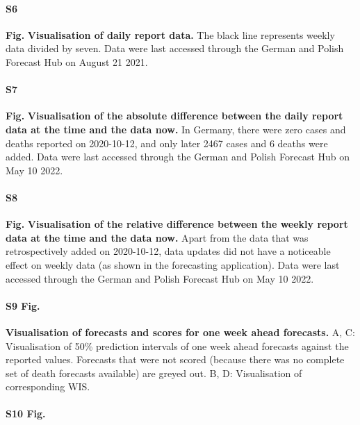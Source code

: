 \documentclass[10pt,letterpaper]{article}
\begin{document}
\paragraph{S6}

\textbf{Fig.} \label{fig:daily-truth}
\textbf{Visualisation of daily report data.} The black line represents
weekly data divided by seven. Data were last accessed through the German
and Polish Forecast Hub on August 21 2021.

\paragraph{S7}

\textbf{Fig.} \label{fig:daily-truth-update}
\textbf{Visualisation of the absolute difference between the daily report data at the time and the data now.}
In Germany, there were zero cases and deaths reported on 2020-10-12, and
only later 2467 cases and 6 deaths were added. Data were last accessed
through the German and Polish Forecast Hub on May 10 2022.

\paragraph{S8}

\textbf{Fig.} \label{fig:weekly-truth-update}
\textbf{Visualisation of the relative difference between the weekly report data at the time and the data now.}
Apart from the data that was retrospectively added on 2020-10-12, data
updates did not have a noticeable effect on weekly data (as shown in the
forecasting application). Data were last accessed through the German and
Polish Forecast Hub on May 10 2022.

\paragraph{S9 Fig.}
\label{fig:forecasts-and-truth-1}

\textbf{Visualisation of forecasts and scores for one week ahead forecasts.}
A, C: Visualisation of 50\% prediction intervals of one week ahead
forecasts against the reported values. Forecasts that were not scored
(because there was no complete set of death forecasts available) are
greyed out. B, D: Visualisation of corresponding WIS.

\paragraph{S10 Fig.}
\label{fig:forecasts-and-truth-3}
\end{document}
